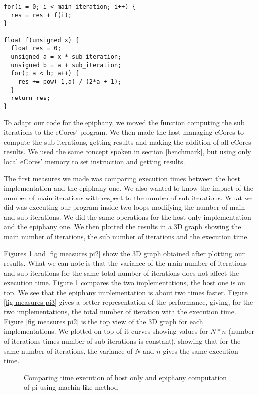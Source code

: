 \begin{lstlisting}
for(i = 0; i < main_iteration; i++) {
  res = res + f(i);
}

float f(unsigned x) {
  float res = 0;
  unsigned a = x * sub_iteration;
  unsigned b = a + sub_iteration;
  for(; a < b; a++) {
    res += pow(-1,a) / (2*a + 1);
  }
  return res;
}
\end{lstlisting}

To adapt our code for the \gls{epiphany}, we moved the function computing the sub iterations to the \glspl{eCore}' program. We then made the host managing \glspl{eCore} to compute the sub iterations, getting results and making the addition of all \glspl{eCore} results. We used the same concept spoken in section \ref{benchmark}, but using only local \glspl{eCore}' memory to set instruction and getting results.

The first measures we made was comparing execution times between the host implementation and the \gls{epiphany} one. We also wanted to know the impact of the number of main iterations with respect to the number of sub iterations. What we did was executing our program inside two loops modifying the number of main and sub iterations. We did the same operations for the host only implementation and the \gls{epiphany} one. We then plotted the results in a 3D graph showing the main number of iterations, the sub number of iterations and the execution time.

Figures \ref{fig measures pi1} and \ref{fig measures pi2} show the 3D graph obtained after plotting our results. What we can note is that the variance of the main number of iterations and sub iterations for the same total number of iterations does not affect the execution time. Figure \ref{fig measures pi1} compares the two implementations, the host one is on top. We see that the \gls{epiphany} implementation is about two times faster. Figure \ref{fig measures pi3} gives a better representation of the performance, giving, for the two implementations, the total number of iteration with the execution time. Figure \ref{fig measures pi2} is the top view of the 3D graph for each implementations. We plotted on top of it curves showing values for $N*n$ (number of iterations times number of sub iterations is constant), showing that for the same number of iterations, the variance of $N$ and $n$ gives the same execution time.

\begin{figure}[h!]
\centering
\noindent{}
\caption{Comparing time execution of host only and \gls{epiphany} computation of pi using machin-like method}
\label{fig measures pi1}
\end{figure}

